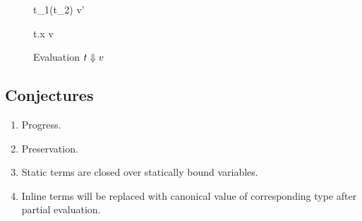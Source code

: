 \begin{figure}[H]

  {t_1(t_2) \e v'}

  {t.x \e v}
\caption{Evaluation $t \Downarrow v$}
\end{figure}

\subsection{Conjectures}

\begin{enumerate}
  \item Progress.
  \item Preservation.
  \item Static terms are closed over statically bound variables.
  \item Inline terms will be replaced with canonical value of corresponding type after partial evaluation.
\end{enumerate}
